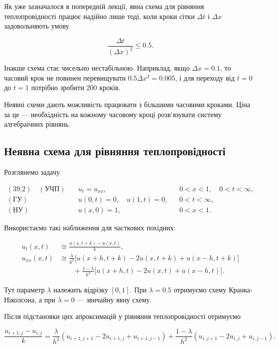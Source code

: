 \documentclass[
  ukrainian,
]{article}
\begin{document}
Як уже зазначалося в попередній лекції, явна схема для рівняння
теплопровідності працює надійно лише тоді, коли кроки сітки \(\Delta t\)
і \(\Delta x\) задовольняють умову

\[\frac{\Delta t}{(\Delta x)^2}\le 0.5.\]

Інакше схема стає чисельно нестабільною. Наприклад, якщо
\(\Delta x=0.1\), то часовий крок не повинен перевищувати
\(0.5\Delta x^2=0.005\), і для переходу від \(t=0\) до \(t=1\) потрібно
зробити 200 кроків.

Неявні схеми дають можливість працювати з більшими часовими кроками.
Ціна за це --- необхідність на кожному часовому кроці розв'язувати
систему алгебраїчних рівнянь.

\subsection{Неявна схема для рівняння
теплопровідності}\label{ux43dux435ux44fux432ux43dux430-ux441ux445ux435ux43cux430-ux434ux43bux44f-ux440ux456ux432ux43dux44fux43dux43dux44f-ux442ux435ux43fux43bux43eux43fux440ux43eux432ux456ux434ux43dux43eux441ux442ux456}

Розглянемо задачу

\[\begin{aligned}(39.2)\quad (\text{УЧП})\quad & u_t=u_{xx}, && 0<x<1,\quad 0<t<\infty,\\(\text{ГУ})\quad & u(0,t)=0,\quad u(1,t)=0, && 0<t<\infty,\\(\text{НУ})\quad & u(x,0)=1, && 0<x<1.\end{aligned}\]

Використаємо такі наближення для часткових похідних:

\[\begin{aligned}u_t(x,t) &\cong \frac{u(x,t+k)-u(x,t)}{k},\\u_{xx}(x,t) &\cong\frac{\lambda}{h^2}\bigl[u(x+h,t+k)-2u(x,t+k)+u(x-h,t+k)\bigr]\\&\qquad +\frac{1-\lambda}{h^2}\bigl[u(x+h,t)-2u(x,t)+u(x-h,t)\bigr].\end{aligned}\]

Тут параметр \(\lambda\) належить відрізку \([0,1]\). При
\(\lambda=0.5\) отримуємо схему Кранка-Ніколсона, а при \(\lambda=0\)
--- звичайну явну схему.

Після підстановки цих апроксимацій у рівняння теплопровідності отримуємо

\[\frac{u_{i+1,j}-u_{i,j}}{k}=\frac{\lambda}{h^2}\left(u_{i+1,j+1}-2u_{i+1,j}+u_{i+1,j-1}\right)+\frac{1-\lambda}{h^2}\left(u_{i,j+1}-2u_{i,j}+u_{i,j-1}\right).\]
\end{document}
